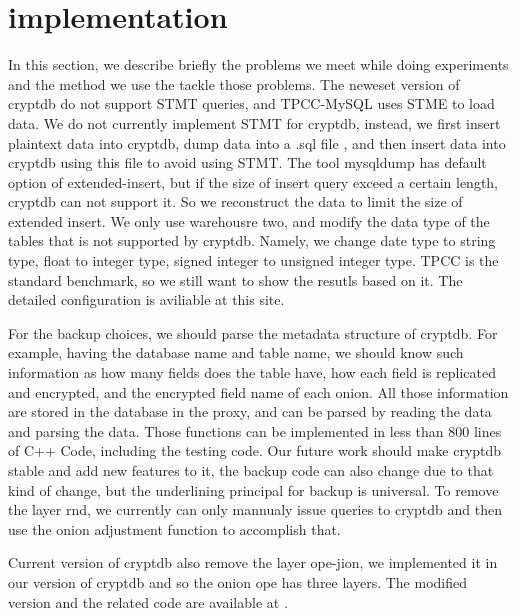 \section{implementation}

In this section, we describe briefly the problems we meet while doing experiments and the method we use the tackle those problems. The neweset version of cryptdb do not support STMT\citep{mysql-stmt} queries, and TPCC-MySQL uses STME to load data. We do not currently implement STMT for cryptdb, instead, we first insert plaintext data into cryptdb, dump data into a .sql file , and then insert data into cryptdb using this file to avoid using STMT. The tool mysqldump has default option of extended-insert\citep{mysqldump-extended-insert}, but if the size of insert query exceed a certain length, cryptdb can not support it. So we reconstruct the data to limit the size of extended insert. We only use warehousre two, and modify the data type of the tables that is not supported by cryptdb. Namely, we change date type to string type, float to integer type, signed integer to unsigned integer type. TPCC is the standard benchmark, so we still want to show the resutls based on it. The detailed configuration is aviliable at this site\citep{practical-cryptdb}.

For the backup choices, we should parse the metadata structure of cryptdb. For example, having the database name and table name, we should know such information as how many fields does the table have, how each field is replicated and encrypted, and the encrypted field name of each onion. All those information are stored in the database in the proxy, and can be parsed by reading the data and parsing the data. Those functions can be implemented in less than 800 lines of C++ Code, including the testing code. Our future work should make cryptdb stable and add new features to it, the backup code can also change due to that kind of change, but the underlining principal for backup is universal. To remove the layer rnd, we currently can only mannualy issue queries to cryptdb and then use the onion adjustment function to  accomplish that.

Current version of cryptdb also remove the layer ope-jion, we implemented it in our version of cryptdb and so the onion ope has three layers. The modified version and the related code are available at \citep{practical-cryptdb}.
